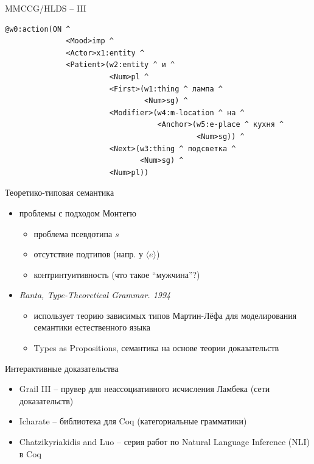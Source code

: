 \documentclass{beamer}
\begin{document}
\begin{frame}[fragile]{MMCCG/HLDS -- III}
\begin{center}
\begin{footnotesize}
\begin{verbatim}
@w0:action(ON ^ 
              <Mood>imp ^ 
              <Actor>x1:entity ^ 
              <Patient>(w2:entity ^ и ^ 
                        <Num>pl ^ 
                        <First>(w1:thing ^ лампа ^ 
                                <Num>sg) ^ 
                        <Modifier>(w4:m-location ^ на ^ 
                                   <Anchor>(w5:e-place ^ кухня ^ 
                                            <Num>sg)) ^ 
                        <Next>(w3:thing ^ подсветка ^ 
                               <Num>sg) ^ 
                        <Num>pl))
\end{verbatim}
\end{footnotesize}
\end{center}
\end{frame} 

\begin{frame}{Теоретико-типовая семантика}
\begin{small}
\begin{itemize}
	\item проблемы с подходом Монтегю
	\begin{itemize}
    		\item проблема псевдотипа $s$
	    \item отсутствие подтипов (напр. у $\langle e \rangle$)
	    	\item контринтуитивность (что такое ``мужчина''?)
	\end{itemize}
	\item \textit{Ranta, Type-Theoretical Grammar. 1994}
	\begin{itemize}
    		\item использует теорию зависимых типов Мартин-Лёфа для моделирования семантики естественного языка
	    \item Types as Propositions, семантика на основе теории доказательств
	\end{itemize}
\end{itemize}
\end{small}
\end{frame}

\begin{frame}{Интерактивные доказательства}
\begin{small}
\begin{itemize}
	\item Grail III -- прувер для неассоциативного исчисления Ламбека (сети доказательств)
	\item Icharate -- библиотека для Coq (категориальные грамматики)
	\item Chatzikyriakidis and Luo -- серия работ по Natural Language Inference (NLI) в Coq
\end{itemize}
\end{small}
\end{frame}
\end{document}
